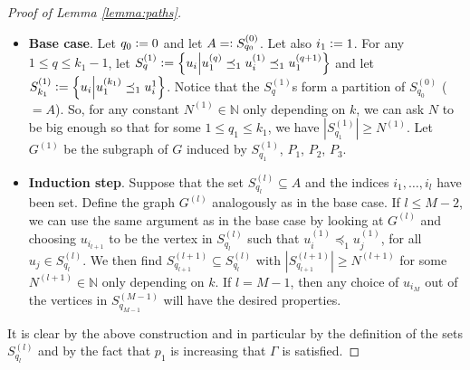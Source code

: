 \documentclass[12pt]{article}
\theoremstyle{definition}
\newcommand{\defeq}{\vcentcolon=}
\newcommand{\eqdef}{=\vcentcolon}
\begin{document}
\begin{proof}[Proof of Lemma \ref{lemma:paths}]
        \begin{itemize}
            \item \textbf{Base case}.
                Let $q_0 \defeq 0$ and let 
                $A \eqdef S^{\left(0\right)}_{q_0}$.
                Let also
                $i_1 \defeq 1$. For any
                $1 \leq q \leq k_1 - 1$,
                let $S^{\left(1\right)}_{q}
                \defeq \left\{u_{i}
                \middle| u_1^{\left(q\right)} \preceq_1
                u_{i}^{\left(1\right)} \preceq_1 
                u_1^{\left(q+1\right)}\right\}$
                and let
                $S^{\left(1\right)}_{k_1} \defeq
                \left\{u_{i} \middle|
                u_1^{\left(k_1\right)} \preceq_1
                u_{i}^{1}\right\}$.
                Notice that the
                $S^{\left(1\right)}_{q}$s
                form a partition of $S^{\left(0\right)}_{q_0}$ ($= A$).
                So, for any constant  $N^{\left(1\right)} \in \mathbb{N}$
                only depending on $k$, we can ask $N$
                to be big enough so that for some
                $1 \leq q_1 \leq k_1$, we have
                $\left|S_{q_1}^{\left(1\right)}\right|
                \geq N^{\left(1\right)}$.
                Let $G^{\left(1\right)}$ be the subgraph
                of $G$ induced by $S^{\left(1\right)}_{q_{1}}$,
                $P_1$, $P_2$, $P_3$.
            \item \textbf{Induction step}.
                Suppose that the set $S^{\left(l\right)}_{q_{l}} \subseteq A$
                and the indices $i_{1}, \ldots, i_{l}$
                have been set. Define the graph $G^{\left(l\right)}$
                analogously as in the base case.
                If $l \leq M-2$, 
                we can use the same
                argument as in the base case by looking
                at $G^{\left(l\right)}$
                and choosing $u_{i_{l+1}}$ 
                to be the vertex in $S^{\left(l\right)}_{q_{l}}$ 
                such that $u_{i}^{\left(1\right)} \preceq_1 u_{j}^{\left(1\right)}$,
                for all $u_{j} \in S^{\left(l\right)}_{q_{l}}$.
                We then find
                $S^{\left(l+1\right)}_{q_{l + 1}} \subseteq 
                S^{\left(l\right)}_{q_{l}}$ with
                $\left|S^{\left(l+1\right)}_{q_{l+1}}\right|
                \geq N^{\left(l+1\right)}$ for
                some $N^{\left(l+1\right)} \in \mathbb{N}$ 
                only depending on $k$.
                If $l = M-1$, then any choice of $u_{i_{M}}$
                out of the vertices in $S^{\left(M-1\right)}_{q_{M-1}}$ 
                will have the desired properties.
        \end{itemize}
        It is clear by the above construction and
        in particular by the definition 
        of the sets $S_{q_{l}}^{\left(l\right)}$ and
        by the fact that $p_1$ 
        is increasing that $\Gamma$ is satisfied.


\end{proof}
\end{document}
